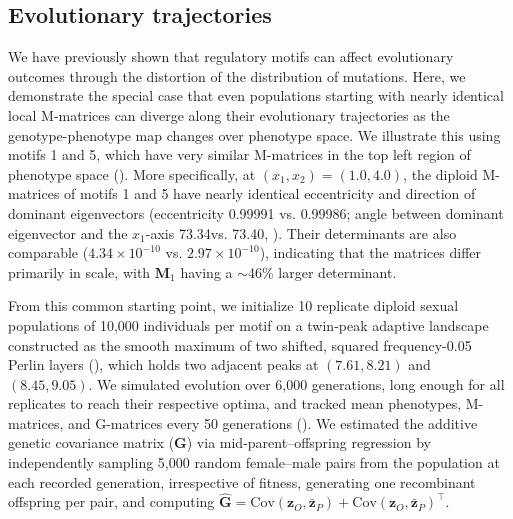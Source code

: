 \subsection{Evolutionary trajectories}

We have previously shown that regulatory motifs can affect evolutionary outcomes through the distortion of the distribution of mutations.
Here, we demonstrate the special case that even populations starting with nearly identical local M-matrices can diverge along their evolutionary trajectories as the genotype-phenotype map changes over phenotype space.
We illustrate this using motifs 1 and 5, which have very similar M-matrices in the top left region of phenotype space ().
More specifically, at $(x_1, x_2) = (1.0, 4.0)$, the diploid M-matrices of motifs 1 and 5 have nearly identical eccentricity and direction of dominant eigenvectors (eccentricity 0.99991 vs. 0.99986; angle between dominant eigenvector and the $x_1$-axis 73.34\degree vs. 73.40\degree, ).
Their determinants are also comparable ($4.34 \times 10^{-10}$ vs. $2.97 \times 10^{-10}$), indicating that the matrices differ primarily in scale, with $\mathbf{M}_1$ having a $\sim$46\% larger determinant.

From this common starting point, we initialize 10 replicate diploid sexual populations of 10,000 individuals per motif on a twin-peak adaptive landscape constructed as the smooth maximum of two shifted, squared frequency-0.05 Perlin layers (), which holds two adjacent peaks at $(7.61, 8.21)$ and $(8.45, 9.05)$.
We simulated evolution over 6,000 generations, long enough for all replicates to reach their respective optima, and tracked mean phenotypes, M-matrices, and G-matrices every 50 generations ().
We estimated the additive genetic covariance matrix ($\mathbf{G}$) via mid-parent--offspring regression by independently sampling 5,000 random female--male pairs from the population at each recorded generation, irrespective of fitness, generating one recombinant offspring per pair, and computing $\hat{\mathbf{G}} = \mathrm{Cov}(\mathbf{z}_O, \bar{\mathbf{z}}_P) + \mathrm{Cov}(\mathbf{z}_O, \bar{\mathbf{z}}_P)^\top$.

